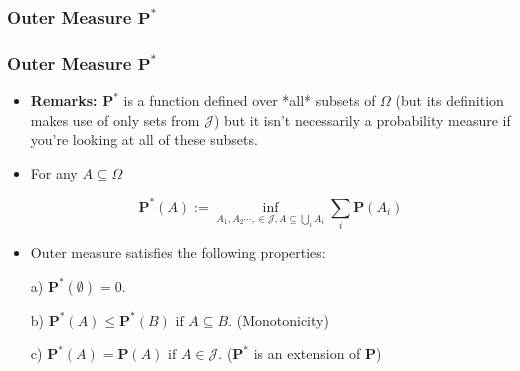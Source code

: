 \documentclass[%
]{beamer}
\newcommand{\BP}{\mathbf{P}}
\begin{document}
\subsubsection{Outer Measure $\BP^*$}
\frame
{
  \frametitle{Outer Measure $\BP^*$}

   \begin{itemize}

      
       \item<1-> \textbf{Remarks:} $\BP^*$ is a function defined over *all* subsets of $\Omega$ (but its definition makes use of only sets from $\mathcal{J}$) but it isn't necessarily a probability measure if you're looking at all of these subsets. 
       
       
		\item<2-> For any $A\subseteq \Omega$
       
       $$\BP^*(A):=\inf_{A_1,A_2\cdots, \in \mathcal{J}, A\subseteq \bigcup_i A_i} \sum_i \BP(A_i) $$
       
        \item<3->   [] \begin{Lemma} Outer measure satisfies the following properties:  
       
       a) $\BP^*(\emptyset)=0.$
       
       b) $\BP^*(A)\leq \BP^*(B)\text{ if } A\subseteq B.$ (Monotonicity)

       c) $\BP^*(A)= \BP(A)\text{ if } A\in \mathcal{J}.$ ($\BP^*$ is an extension of $\BP$)
        \end{Lemma}    
    
                 \end{itemize}
}
\end{document}
